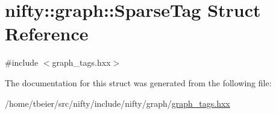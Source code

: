 \hypertarget{structnifty_1_1graph_1_1SparseTag}{}\section{nifty\+:\+:graph\+:\+:Sparse\+Tag Struct Reference}
\label{structnifty_1_1graph_1_1SparseTag}


{\ttfamily \#include $<$graph\+\_\+tags.\+hxx$>$}



The documentation for this struct was generated from the following file\+:\begin{DoxyCompactItemize}
\item 
/home/tbeier/src/nifty/include/nifty/graph/\hyperlink{graph__tags_8hxx}{graph\+\_\+tags.\+hxx}\end{DoxyCompactItemize}
